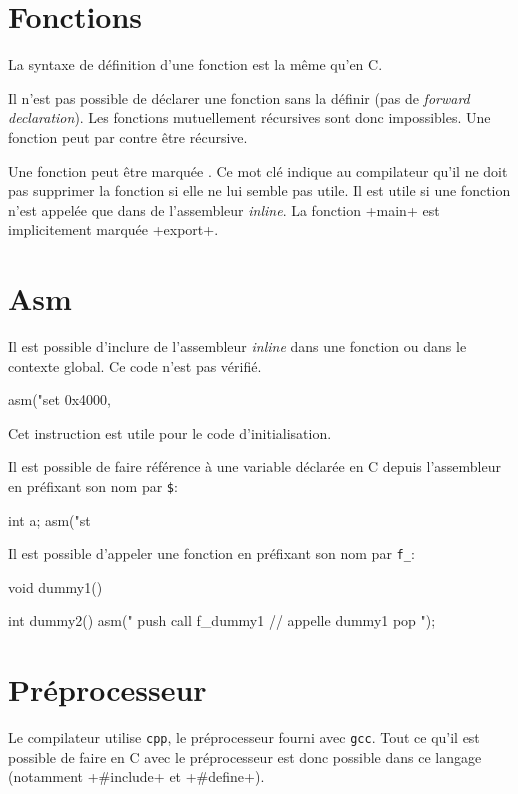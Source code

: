 \documentclass[a4paper]{article}
\begin{document}
  \section{Fonctions}
    La syntaxe de définition d'une fonction est la même qu'en C.

    Il n'est pas possible de déclarer une fonction sans la définir (pas de
    \emph{forward declaration}). Les fonctions mutuellement récursives sont donc
    impossibles. Une fonction peut par contre être récursive.

    Une fonction peut être marquée . Ce mot clé indique au
    compilateur qu'il ne doit pas supprimer la fonction si elle ne lui semble
    pas utile. Il est utile si une fonction n'est appelée que dans de
    l'assembleur \emph{inline}. La fonction \imoc+main+ est implicitement
    marquée \imoc+export+.

  \section{Asm}
    Il est possible d'inclure de l'assembleur \emph{inline} dans une fonction ou
    dans le contexte global. Ce code n'est pas vérifié.

    \begin{moc}
asm("set 0x4000, %
    \end{moc}

    Cet instruction est utile pour le code d'initialisation.

    Il est possible de faire référence à une variable déclarée en C depuis
    l'assembleur en préfixant son nom par \verb+$+:
    \begin{moc}
int a;
asm("st %
    \end{moc}

    Il est possible d'appeler une fonction en préfixant son nom par \verb+f_+:
    \begin{moc}
void dummy1() {
}

int dummy2() {
    asm("
        push %
        call f_dummy1 // appelle dummy1
        pop %
    ");
}
    \end{moc}

  \section{Préprocesseur}
    Le compilateur utilise \verb+cpp+, le préprocesseur fourni avec \verb+gcc+.
    Tout ce qu'il est possible de faire en C avec le préprocesseur est donc
    possible dans ce langage (notamment \imoc+#include+ et \imoc+#define+).
\end{document}
